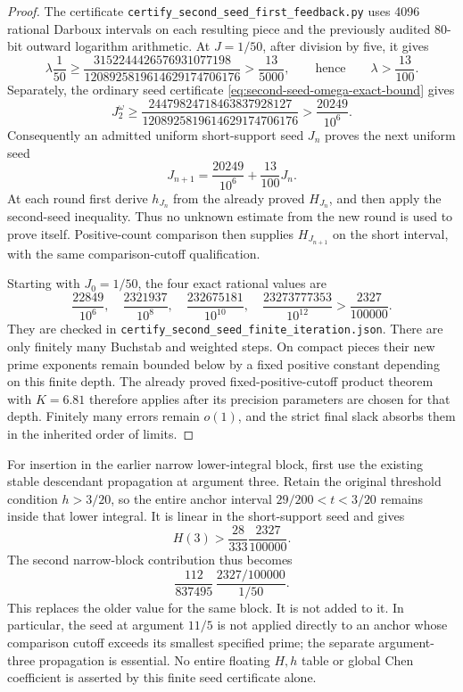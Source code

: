 \begin{proof}
The certificate \texttt{certify\_second\_seed\_first\_feedback.py}
uses 4096 rational Darboux intervals on each resulting piece and
the previously audited 80-bit outward logarithm arithmetic. At
$J=1/50$, after division by five, it gives
\[
 \lambda\frac1{50}\ge
 \frac{3152244426576931077198}{1208925819614629174706176}
 >\frac{13}{5000},
 \qquad\text{hence}\qquad \lambda>\frac{13}{100}.
\]
Separately, the ordinary seed certificate
\eqref{eq:second-seed-omega-exact-bound} gives
\[
 J_2^\omega\ge
 \frac{24479824718463837928127}{1208925819614629174706176}
 >\frac{20249}{10^6}.
\]
Consequently an admitted uniform short-support seed $J_n$ proves
the next uniform seed
\[
 J_{n+1}=\frac{20249}{10^6}+\frac{13}{100}J_n.
\]
At each round first derive $h_{J_n}$ from the already proved
$H_{J_n}$, and then apply the second-seed inequality. Thus no
unknown estimate from the new round is used to prove itself.
Positive-count comparison then supplies $H_{J_{n+1}}$ on the
short interval, with the same comparison-cutoff qualification.

Starting with $J_0=1/50$, the four exact rational values are
\[
 \frac{22849}{10^6},\quad
 \frac{2321937}{10^8},\quad
 \frac{232675181}{10^{10}},\quad
 \frac{23273777353}{10^{12}}
 >\frac{2327}{100000}.
\]
They are checked in
\texttt{certify\_second\_seed\_finite\_iteration.json}.
There are only finitely many Buchstab and weighted steps. On
compact pieces their new prime exponents remain bounded below by
a fixed positive constant depending on this finite depth. The
already proved fixed-positive-cutoff product theorem with $K=6.81$
therefore applies after its precision parameters are chosen for
that depth. Finitely many errors remain $o(1)$, and the strict
final slack absorbs them in the inherited order of limits.
\end{proof}

For insertion in the earlier narrow lower-integral block, first
use the existing stable descendant propagation at argument three.
Retain the original threshold condition $h>3/20$, so the entire
anchor interval $29/200<t<3/20$ remains inside that lower integral.
It is linear in the short-support seed and gives
\[
 H(3)>\frac{28}{333}\frac{2327}{100000}.
\]
The second narrow-block contribution thus becomes
\[
 \frac{112}{837495}\,
 \frac{2327/100000}{1/50}.
\]
This replaces the older value for the same block. It is not added
to it. In particular, the seed at argument $11/5$ is not applied
directly to an anchor whose comparison cutoff exceeds its smallest
specified prime; the separate argument-three propagation is
essential. No entire floating $H,h$ table or global Chen coefficient
is asserted by this finite seed certificate alone.
